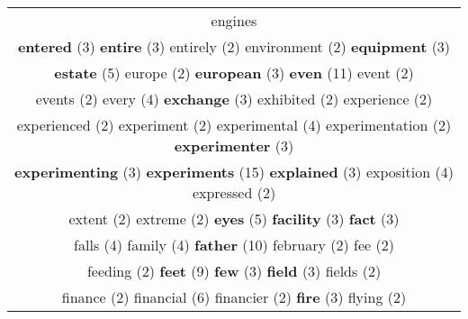 \documentclass[12pt,a4paper]{article}
\begin{document}
\begin{center}
\begin{longtable}{|c|}
{engines}} \footnotesize{(2)}  \\ {\small \textcolor{Laranja} {\bf entered}} \footnotesize{(3)} {\small \textcolor{Laranja} {\bf entire}} \footnotesize{(3)} {\footnotesize \textcolor{Verde} {entirely}} \footnotesize{(2)} {\footnotesize \textcolor{Verde} {environment}} \footnotesize{(2)} {\small \textcolor{Laranja} {\bf equipment}} \footnotesize{(3)}  \\ {\large \textcolor{Roxo} {\bf estate}} \footnotesize{(5)} {\footnotesize \textcolor{Verde} {europe}} \footnotesize{(2)} {\small \textcolor{Laranja} {\bf european}} \footnotesize{(3)} {\Huge \textcolor{AzulEscuro} {\bf even}} \footnotesize{(11)} {\footnotesize \textcolor{Verde} {event}} \footnotesize{(2)}  \\ {\footnotesize \textcolor{Verde} {events}} \footnotesize{(2)} {\normalsize \textcolor{VerdeLocao} {every}} \footnotesize{(4)} {\small \textcolor{Laranja} {\bf exchange}} \footnotesize{(3)} {\footnotesize \textcolor{Verde} {exhibited}} \footnotesize{(2)} {\footnotesize \textcolor{Verde} {experience}} \footnotesize{(2)}  \\ {\footnotesize \textcolor{Verde} {experienced}} \footnotesize{(2)} {\footnotesize \textcolor{Verde} {experiment}} \footnotesize{(2)} {\normalsize \textcolor{VerdeLocao} {experimental}} \footnotesize{(4)} {\footnotesize \textcolor{Verde} {experimentation}} \footnotesize{(2)} {\small \textcolor{Laranja} {\bf experimenter}} \footnotesize{(3)}  \\ {\small \textcolor{Laranja} {\bf experimenting}} \footnotesize{(3)} {\Huge \textcolor{AzulEscuro} {\bf experiments}} \footnotesize{(15)} {\small \textcolor{Laranja} {\bf explained}} \footnotesize{(3)} {\normalsize \textcolor{VerdeLocao} {exposition}} \footnotesize{(4)} {\footnotesize \textcolor{Verde} {expressed}} \footnotesize{(2)}  \\ {\footnotesize \textcolor{Verde} {extent}} \footnotesize{(2)} {\footnotesize \textcolor{Verde} {extreme}} \footnotesize{(2)} {\large \textcolor{Roxo} {\bf eyes}} \footnotesize{(5)} {\small \textcolor{Laranja} {\bf facility}} \footnotesize{(3)} {\small \textcolor{Laranja} {\bf fact}} \footnotesize{(3)}  \\ {\normalsize \textcolor{VerdeLocao} {falls}} \footnotesize{(4)} {\normalsize \textcolor{VerdeLocao} {family}} \footnotesize{(4)} {\Huge \textcolor{AzulEscuro} {\bf father}} \footnotesize{(10)} {\footnotesize \textcolor{Verde} {february}} \footnotesize{(2)} {\footnotesize \textcolor{Verde} {fee}} \footnotesize{(2)}  \\ {\footnotesize \textcolor{Verde} {feeding}} \footnotesize{(2)} {\Huge \textcolor{AzulEscuro} {\bf feet}} \footnotesize{(9)} {\small \textcolor{Laranja} {\bf few}} \footnotesize{(3)} {\small \textcolor{Laranja} {\bf field}} \footnotesize{(3)} {\footnotesize \textcolor{Verde} {fields}} \footnotesize{(2)}  \\ {\footnotesize \textcolor{Verde} {finance}} \footnotesize{(2)} {\Large \textcolor{VermEscuro} {financial}} \footnotesize{(6)} {\footnotesize \textcolor{Verde} {financier}} \footnotesize{(2)} {\small \textcolor{Laranja} {\bf fire}} \footnotesize{(3)} {\footnotesize \textcolor{Verde} {flying}} \footnotesize{(2)}  
\end{longtable}
\end{center}
\end{document}
